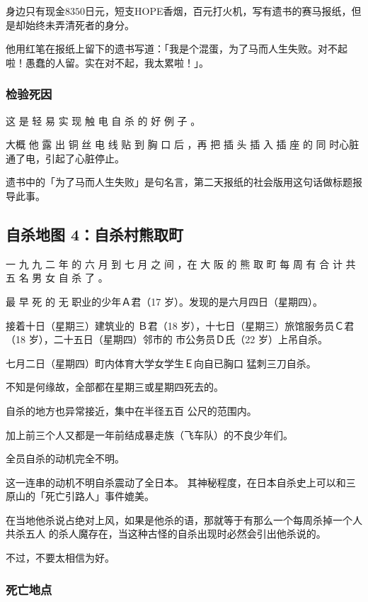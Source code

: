 \documentclass[UTF8]{ctexart}
\begin{document}
身边只有现金$8350$日元，短支HOPE香烟，百元打火机，写有遗书的赛马报纸，但是却始终未弄清死者的身分。

他用红笔在报纸上留下的遗书写道：「我是个混蛋，为了马而人生失败。对不起啦！愚蠢的人留。实在对不起，我太累啦！」。

\subsubsection*{检验死因}

这 是 轻 易 实 现 触 电 自 杀 的 好 例 子 。

大概 他 露 出 铜 丝 电 线 贴 到 胸 口 后 ，再 把 插 头 插 入 插 座 的 同 时心脏通了电，引起了心脏停止。

遗书中的「为了马而人生失败」是句名言，第二天报纸的社会版用这句话做标题报导此事。


\subsection{自杀地图 4：自杀村熊取町}

一 九 九 二 年 的 六 月 到 七 月 之 间 ，在 大 阪 的 熊 取 町 每 周 有 合 计 共 五 名 男 女 自 杀 了 。

最 早 死 的 无 职业的少年Ａ君（17 岁）。发现的是六月四日（星期四）。

接着十日（星期三）建筑业的 Ｂ君（18 岁），十七日（星期三）旅馆服务员Ｃ君（18 岁），二十五日（星期四）邻市的 市公务员Ｄ氏（22 岁）上吊自杀。

七月二日（星期四）町内体育大学女学生Ｅ向自已胸口 猛刺三刀自杀。 

不知是何缘故，全部都在星期三或星期四死去的。

自杀的地方也异常接近，集中在半径五百 公尺的范围内。

加上前三个人又都是一年前结成暴走族（飞车队）的不良少年们。

全员自杀的动机完全不明。

这一连串的动机不明自杀震动了全日本。
其神秘程度，在日本自杀史上可以和三原山的「死亡引路人」事件媲美。 

在当地他杀说占绝对上风，如果是他杀的语，那就等于有那么一个每周杀掉一个人共杀五人
的杀人魔存在，当这种古怪的自杀出现时必然会引出他杀说的。

不过，不要太相信为好。

\subsubsection{死亡地点}
\end{document}

